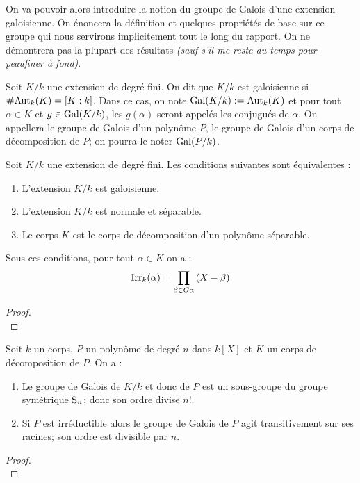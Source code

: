\documentclass[a4paper]{article} %
\numberwithin{section}{part}
\numberwithin{equation}{section}
\newcommand\Irr[2]{\textup{Irr}_{#1}(#2)}
\begin{document}
On va pouvoir alors introduire la notion du groupe de Galois d'une extension
galoisienne. On énoncera la définition et quelques propriétés de base sur ce
groupe qui nous servirons implicitement tout le long du rapport. On ne
démontrera pas la plupart des résultats \textit{(sauf s'il me reste du temps
pour peaufiner à fond)}. 

\begin{defn}
Soit $K/k$ une extension de degré fini. On dit que $K/k$ est galoisienne si
$\#\textup{Aut}_k(K) = [K:k]$. Dans ce cas, on note $\textup{Gal}(K/k) :=
\textup{Aut}_k(K)$ et pour tout $\alpha\in K$ et $g\in\textup{Gal}(K/k)$, les
$g(\alpha)$ seront appelés les conjugués de $\alpha$.
On appellera le groupe de Galois d'un polynôme $P$, le groupe de Galois d'un
corps de décomposition de $P$; on pourra le noter $\textup{Gal}(P/k)$.
\end{defn}

\begin{thm}
Soit $K/k$ une extension de degré fini. Les conditions suivantes sont
équivalentes :
\begin{enumerate}
\item L'extension $K/k$ est galoisienne.
\item L'extension $K/k$ est normale et séparable.
\item Le corps $K$ est le corps de décomposition d'un polynôme séparable.
\end{enumerate}
Sous ces conditions, pour tout $\alpha\in K$ on a :
\[\Irr{k}{\alpha} = \prod_{\beta\in G\alpha}{(X - \beta)}\]
\end{thm}
\begin{proof}
\cite[Chap. VIII, p.~169]{Pol}\\
\end{proof}


\begin{thm} Soit $k$ un corps, $P$ un polynôme de degré $n$ dans $k[X]$ et $K$ 
un corps de décomposition de $P$. On a :
\begin{enumerate}
\item Le groupe de Galois de $K/k$ et donc de $P$ est un sous-groupe du groupe
symétrique $\textup{S}_n$; donc son ordre divise $n!$.
\item Si $P$ est irréductible alors le groupe de Galois de $P$ agit
transitivement sur ses racines; son ordre est divisible par $n$.
\end{enumerate}
\end{thm}
\begin{proof}
\cite[Chap. IX, p.~206]{Pol}\\
\end{proof}
\end{document}
